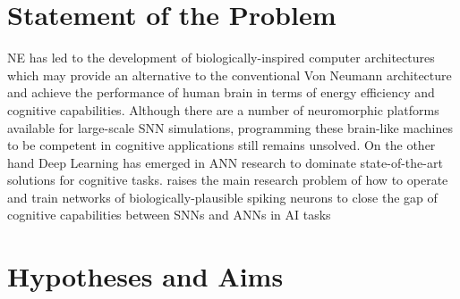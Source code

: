 \section{Statement of the Problem}
\label{sec:state_problem}
NE has led to the development of biologically-inspired computer architectures which may provide an alternative to the conventional Von Neumann architecture and achieve the performance of \DIFaddbegin {}\DIFaddend human brain in terms of energy efficiency and cognitive capabilities.
Although there are a number of neuromorphic platforms available for large-scale SNN simulations, programming these brain-like machines to be competent in cognitive applications still remains unsolved.
On the other hand Deep Learning has emerged in ANN research to dominate state-of-the-art solutions for cognitive tasks.
\DIFdelbegin {}\DIFdelend \DIFaddbegin {}\DIFaddend raises the main research problem of how to operate and train networks of biologically-plausible spiking neurons to close the gap of cognitive capabilities between SNNs and ANNs in AI tasks\DIFdelbegin {}\DIFdelend \DIFaddbegin {}\DIFaddend 



\section{Hypotheses and Aims}
\label{sec:aim}


